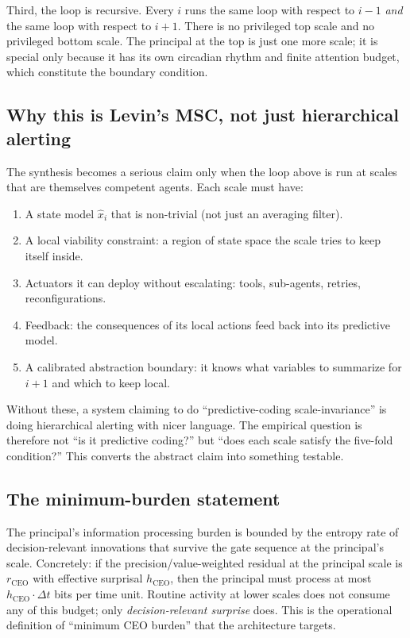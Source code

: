 \documentclass[11pt]{article}
\begin{document}
Third, the loop is recursive. Every $i$ runs the same loop with respect to $i-1$ \emph{and} the same loop with respect to $i+1$. There is no privileged top scale and no privileged bottom scale. The principal at the top is just one more scale; it is special only because it has its own circadian rhythm and finite attention budget, which constitute the boundary condition.

\subsection{Why this is Levin's MSC, not just hierarchical alerting}

The synthesis becomes a serious claim only when the loop above is run at scales that are themselves competent agents. Each scale must have:
\begin{enumerate}[leftmargin=2em, itemsep=0.2em]
  \item A state model $\hat{x}_i$ that is non-trivial (not just an averaging filter).
  \item A local viability constraint: a region of state space the scale tries to keep itself inside.
  \item Actuators it can deploy without escalating: tools, sub-agents, retries, reconfigurations.
  \item Feedback: the consequences of its local actions feed back into its predictive model.
  \item A calibrated abstraction boundary: it knows what variables to summarize for $i+1$ and which to keep local.
\end{enumerate}

Without these, a system claiming to do ``predictive-coding scale-invariance'' is doing hierarchical alerting with nicer language. The empirical question is therefore not ``is it predictive coding?'' but ``does each scale satisfy the five-fold condition?'' This converts the abstract claim into something testable.

\subsection{The minimum-burden statement}

The principal's information processing burden is bounded by the entropy rate of decision-relevant innovations that survive the gate sequence at the principal's scale. Concretely: if the precision/value-weighted residual at the principal scale is $r_{\text{CEO}}$ with effective surprisal $h_{\text{CEO}}$, then the principal must process at most $h_{\text{CEO}} \cdot \Delta t$ bits per time unit. Routine activity at lower scales does not consume any of this budget; only \emph{decision-relevant surprise} does. This is the operational definition of ``minimum CEO burden'' that the architecture targets.
\end{document}
